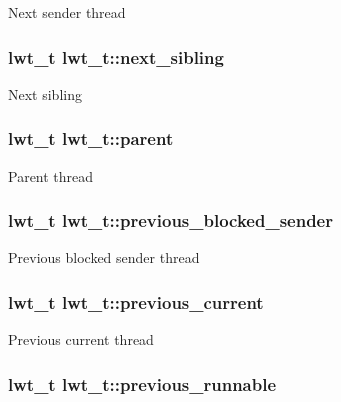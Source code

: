 Next sender thread \hypertarget{structlwt_a5557ab4e2bdd3634b38f5035461767d6}{
\subsubsection[{next\+\_\+sibling}]{\setlength{\rightskip}{0pt plus 5cm}lwt\+\_\+t lwt\+\_\+t\+::next\+\_\+sibling}}\label{structlwt_a5557ab4e2bdd3634b38f5035461767d6}
Next sibling \hypertarget{structlwt_a1849cde569fc8f254db05365de570b0e}{
\subsubsection[{parent}]{\setlength{\rightskip}{0pt plus 5cm}lwt\+\_\+t lwt\+\_\+t\+::parent}}\label{structlwt_a1849cde569fc8f254db05365de570b0e}
Parent thread \hypertarget{structlwt_a2060a9eb6fe521e93c509e10e2778907}{
\subsubsection[{previous\+\_\+blocked\+\_\+sender}]{\setlength{\rightskip}{0pt plus 5cm}lwt\+\_\+t lwt\+\_\+t\+::previous\+\_\+blocked\+\_\+sender}}\label{structlwt_a2060a9eb6fe521e93c509e10e2778907}
Previous blocked sender thread \hypertarget{structlwt_afe18cb4e9b5f4c60289674d2298993a2}{
\subsubsection[{previous\+\_\+current}]{\setlength{\rightskip}{0pt plus 5cm}lwt\+\_\+t lwt\+\_\+t\+::previous\+\_\+current}}\label{structlwt_afe18cb4e9b5f4c60289674d2298993a2}
Previous current thread \hypertarget{structlwt_acb89e009a8cb87cbd5d71ab5ca08911b}{
\subsubsection[{previous\+\_\+runnable}]{\setlength{\rightskip}{0pt plus 5cm}lwt\+\_\+t lwt\+\_\+t\+::previous\+\_\+runnable}}\label{structlwt_acb89e009a8cb87cbd5d71ab5ca08911b}
